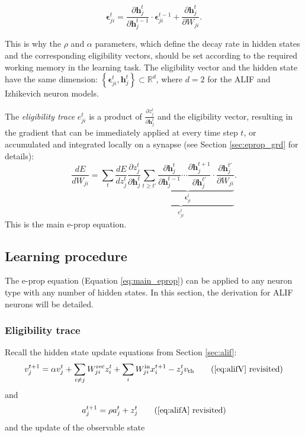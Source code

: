         \begin{equation}
        \bm{\epsilon}^t_{ji} = \frac{\partial\mathbf{h}_j^{t}}{\partial\mathbf{h}_j^{t-1}}\cdot\bm{\epsilon}^{t-1}_{ji} + \frac{\partial\mathbf{h}^t_j}{\partial W_{ji}}.
        \end{equation}

        This is why the $\rho$ and $\alpha$ parameters, which define the decay rate in hidden states and the corresponding eligibility vectors, should be set according to the required working memory in the learning task.
        The eligibility vector and the hidden state have the same dimension: $\left\{\bm{\epsilon}^t_{ji}, \mathbf{h}^t_j\right\} \subset \mathbb{R}^d$, where $d=2$ for the ALIF and Izhikevich neuron models.

        The \emph{eligibility trace} $e^t_{ji}$ is a product of $\frac{\partial z_j^t}{\partial \mathbf{h}_j^t}$ and the eligibility vector, resulting in the gradient that can be immediately applied at every time step $t$, or accumulated and integrated locally on a synapse (see Section \ref{sec:eprop_grd} for details):
        \begin{equation}\label{eq:main_eprop}
        \frac{dE}{dW_{ji}} = \sum_t\frac{dE}{dz_j^t}\underbrace{\frac{\partial z_j^t}{\partial\mathbf{h}_j^t}\underbrace{\sum_{t\geq t'}\frac{\partial\mathbf{h}^t_j}{\partial\mathbf{h}_j^{t-1}} \cdots \frac{\partial\mathbf{h}_j^{t+1}}{\partial\mathbf{h}_j^{t'}}\cdot\frac{\partial\mathbf{h}_j^{t'}}{\partial W_{ji}}}_{\bm{\epsilon}_{ji}^t}}_{e^t_{ji}}.
        \end{equation}
        This is the main e-prop equation.

    \subsection{Learning procedure}

        The e-prop equation (Equation \ref{eq:main_eprop}) can be applied to any neuron type with any number of hidden states.
        In this section, the derivation for ALIF neurons will be detailed.

        \subsubsection{Eligibility trace}
            Recall the hidden state update equations from Section \ref{sec:alif}:
            \begin{equation*}
            v^{t+1}_j = \alpha v_j^t + \sum_{i\neq j}W^\text{rec}_{ji}z_i^t + \sum_i W^\text{in}_{ji}x_i^{t+1} - z_j^tv_
            \text{th} \tag{\ref{eq:alifV} revisited}
            \end{equation*}
            and
            \begin{equation*}
            a^{t+1}_j = \rho a^t_j + z^t_j \tag{\ref{eq:alifA} revisited}
            \end{equation*}
            and the update of the observable state

